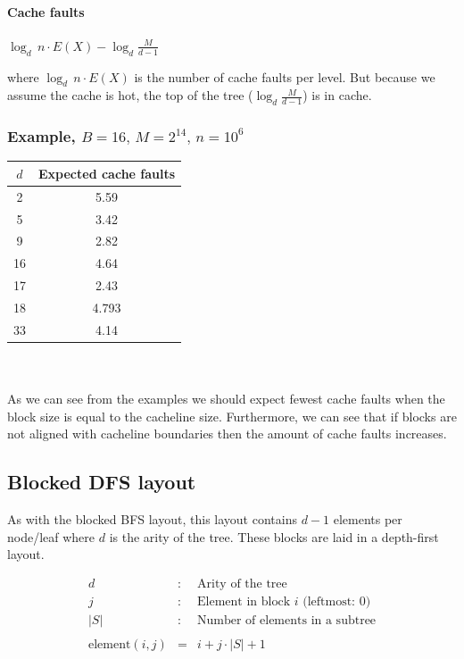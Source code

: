 \paragraph*{Cache faults}

$\log_{d}\, n\cdot E(X)-\log_{d}\frac{M}{d-1}$

where $\log_{d}\, n\cdot E(X)$ is the number of cache faults per level. But because we assume the cache is hot, the top of the tree ($\log_{d}\frac{M}{d-1}$) is in cache.

\subsubsection*{Example, $B=16,\, M=2^{14},\, n=10^{6}$}

\begin{tabular}{|c|c|}
\hline 
$d$ & Expected cache faults\tabularnewline
\hline 
\hline 
2 & 5.59\tabularnewline
\hline 
5 & 3.42\tabularnewline
\hline 
9 & 2.82\tabularnewline
\hline 
16 & 4.64\tabularnewline
\hline 
17 & 2.43\tabularnewline
\hline 
18 & 4.793\tabularnewline
\hline 
33 & 4.14\tabularnewline
\hline 
\end{tabular}
\\
\\
As we can see from the examples we should expect fewest cache faults when the block size is equal to the cacheline size. Furthermore, we can see that if blocks are not aligned with cacheline boundaries then the amount of cache faults increases.


\subsection{Blocked DFS layout}

As with the blocked BFS layout, this layout contains $d - 1$ elements per node/leaf where $d$ is the arity of the tree. These blocks are laid in a depth-first layout.

\begin{eqnarray*}
d & : & \textrm{Arity of the tree} \\
j & : & \textrm{Element in block $i$ (leftmost: $0$)} \\
|S| & : & \textrm{Number of elements in a subtree} \\
\\
\mathrm{element}(i, j) & = & i + j\cdot |S| + 1
\end{eqnarray*}

